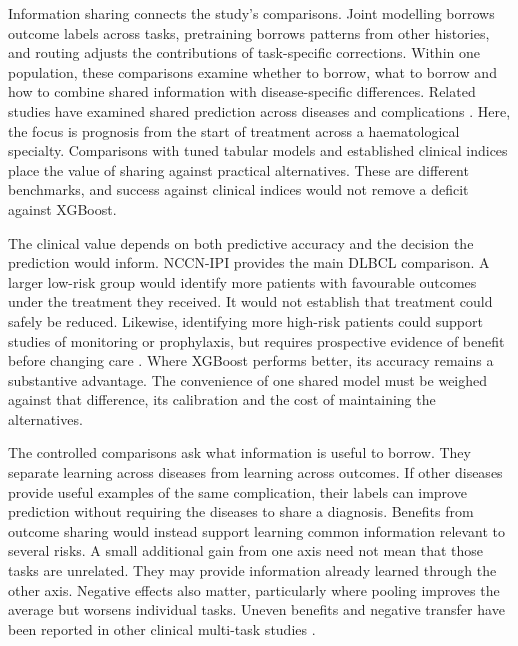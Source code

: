 Information sharing connects the study's comparisons. Joint modelling borrows
outcome labels across tasks, pretraining borrows patterns from other histories,
and routing adjusts the contributions of task-specific corrections. Within one
population, these comparisons examine whether to borrow, what to borrow and
how to combine shared information with disease-specific differences. Related studies have examined shared prediction
across diseases and complications
\citep{ma2026reclaim,lubberstedt2026labs}. Here, the focus is prognosis from the
start of treatment across a haematological specialty. Comparisons with tuned
tabular models and established clinical indices place the value of sharing
against practical alternatives. These are different benchmarks, and success
against clinical indices would not remove a deficit against XGBoost.

The clinical value depends on both predictive accuracy
and the decision the prediction would inform. NCCN-IPI provides the main DLBCL
comparison. 
A larger low-risk group would identify more patients with favourable outcomes
under the treatment they received. It would not establish that treatment could
safely be reduced. Likewise, identifying more high-risk patients could support
studies of monitoring or prophylaxis, but requires prospective evidence of
benefit before changing care \citep{vanGeloven2020,blythe2026economic}.
Where XGBoost performs better, its accuracy remains a substantive advantage.
The convenience of one shared model must be weighed against that difference,
its calibration and the cost of maintaining the alternatives.

The controlled comparisons ask what information is useful to borrow.
They separate learning across diseases from learning across outcomes.  If other diseases
provide useful examples of the same complication, their labels can improve
prediction without requiring the diseases to share a diagnosis. Benefits from
outcome sharing would instead support learning common information relevant to
several risks. A small additional gain from one axis need not mean that those
tasks are unrelated. They may provide information already learned through the
other axis. Negative effects also matter, particularly where pooling improves
the average but worsens individual tasks. Uneven benefits and negative transfer
have been reported in other clinical multi-task studies
\citep{harutyunyan2019multitask,mcdermott2020mtl,ding2019phenotyping}.

